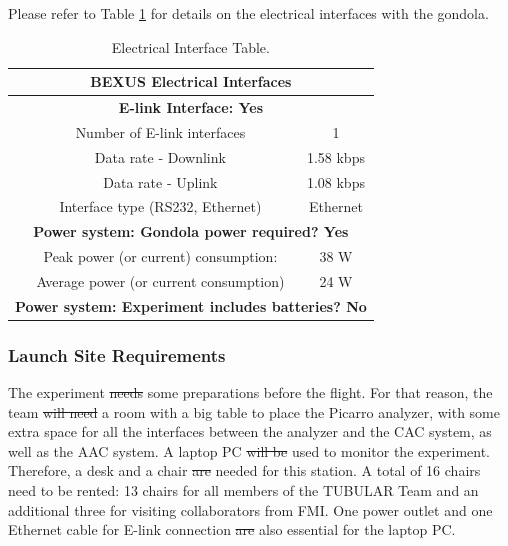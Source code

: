 \documentclass[a4paper,12pt,oneside]{article}
\providecommand{\DIFaddtex}[1]{{\protect\color{blue}\uwave{#1}}} %
\providecommand{\DIFdeltex}[1]{{\protect\color{red}\sout{#1}}}                      %
\providecommand{\DIFaddbegin}{} %
\providecommand{\DIFaddend}{} %
\providecommand{\DIFdelbegin}{} %
\providecommand{\DIFdelend}{} %
\providecommand{\DIFadd}[1]{\texorpdfstring{\DIFaddtex{#1}}{#1}} %
\providecommand{\DIFdel}[1]{\texorpdfstring{\DIFdeltex{#1}}{}} %
\newcommand{\DIFscaledelfig}{0.5}
\newlength{\DIFdelgraphicswidth} %
\newlength{\DIFdelgraphicsheight} %
\newcommand{\DIFaddincludegraphics}[2][]{{\color{blue}\fbox{\DIFOincludegraphics[#1]{#2}}}} %
\newcommand{\DIFdelincludegraphics}[2][]{%
\sbox{\DIFdelgraphicsbox}{\DIFOincludegraphics[#1]{#2}}%
\settoboxwidth{\DIFdelgraphicswidth}{\DIFdelgraphicsbox} %
\settoboxtotalheight{\DIFdelgraphicsheight}{\DIFdelgraphicsbox} %
\scalebox{\DIFscaledelfig}{%
\parbox[b]{\DIFdelgraphicswidth}{\usebox{\DIFdelgraphicsbox}\\[-\baselineskip] \rule{\DIFdelgraphicswidth}{0em}}\llap{\resizebox{\DIFdelgraphicswidth}{\DIFdelgraphicsheight}{%
\setlength{\unitlength}{\DIFdelgraphicswidth}%
\begin{picture}(1,1)%
\thicklines\linethickness{2pt} %
{\color[rgb]{1,0,0}\put(0,0){\framebox(1,1){}}}%
{\color[rgb]{1,0,0}\put(0,0){\line( 1,1){1}}}%
{\color[rgb]{1,0,0}\put(0,1){\line(1,-1){1}}}%
\end{picture}%
}\hspace*{3pt}}} %
} %
\DeclareRobustCommand{\DIFaddbegin}{\DIFOaddbegin \let\includegraphics\DIFaddincludegraphics} %
\DeclareRobustCommand{\DIFaddend}{\DIFOaddend \let\includegraphics\DIFOincludegraphics} %
\DeclareRobustCommand{\DIFdelbegin}{\DIFOdelbegin \let\includegraphics\DIFdelincludegraphics} %
\DeclareRobustCommand{\DIFdelend}{\DIFOaddend \let\includegraphics\DIFOincludegraphics} %
\begin{document}
Please refer to Table \ref{tab:electrical-interface-table} for details on the electrical interfaces with the gondola.


\begin{table}[H]
\centering
\begin{tabular}{|c|c|c|}
\hline
\multicolumn{3}{|c|}{\textbf{BEXUS Electrical Interfaces}}                     \\ \hline
\multicolumn{3}{|c|}{\textbf{E-link Interface: Yes}}                           \\ \hline
\multirow{4}{*}{}    & Number of E-link interfaces               & 1           \\ \cline{2-3} 
                     & Data rate - Downlink                      & 1.58 kbps     \\ \cline{2-3} 
                     & Data rate - Uplink                        & 1.08 kbps      \\ \cline{2-3} 
                     & Interface type (RS232, Ethernet)          & Ethernet    \\ \hline
\multicolumn{3}{|c|}{\textbf{Power system: Gondola power required? Yes}}       \\ \hline
\multirow{2}{*}{}    & Peak power (or current) consumption:      & 38 W            \\ \cline{2-3} 
                     & Average power (or current consumption)    & 24 W            \\ \hline
\multicolumn{3}{|l|}{\textbf{Power system: Experiment includes batteries? No}} \\ \hline
\end{tabular}
\caption{Electrical Interface Table.}
\label{tab:electrical-interface-table}
\end{table}
\raggedbottom

\subsubsection{Launch Site Requirements}
The experiment \DIFdelbegin \DIFdel{needs }\DIFdelend \DIFaddbegin \DIFadd{needed }\DIFaddend some preparations before the flight. For that reason, the team \DIFdelbegin \DIFdel{will need }\DIFdelend \DIFaddbegin \DIFadd{needed }\DIFaddend a room with a big table to place the Picarro analyzer, with some extra space for all the interfaces between the analyzer and the CAC system, as well as the AAC system.
A laptop PC \DIFdelbegin \DIFdel{will be }\DIFdelend \DIFaddbegin \DIFadd{was }\DIFaddend used to monitor the experiment. Therefore, a desk and a chair \DIFdelbegin \DIFdel{are }\DIFdelend \DIFaddbegin \DIFadd{were }\DIFaddend needed for this station. A total of 16 chairs need to be rented: 13 chairs for all members of the TUBULAR Team and an additional three for visiting collaborators from FMI. One power outlet and one Ethernet cable for E-link connection \DIFdelbegin \DIFdel{are }\DIFdelend \DIFaddbegin \DIFadd{were }\DIFaddend also essential for the laptop PC.
\end{document}

